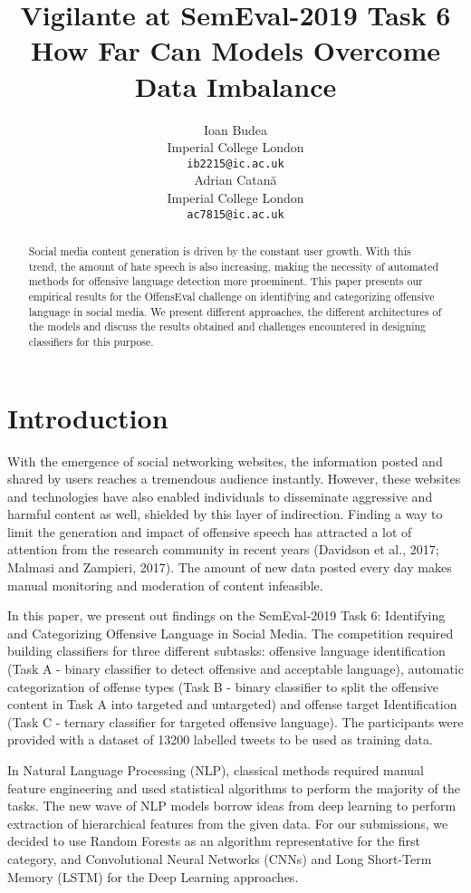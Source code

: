 \documentclass[11pt,a4paper]{article}
\title{Vigilante at SemEval-2019 Task 6 \\ How Far Can Models Overcome Data Imbalance}
\author{Ioan Budea \\
  Imperial College London \\
  {\tt ib2215@ic.ac.uk} \\\And
  Adrian Catan\u{a} \\
  Imperial College London \\
  {\tt ac7815@ic.ac.uk} \\}
\date{}
\begin{document}
\maketitle
\begin{abstract}

  Social media content generation is driven by the constant user growth. With this trend, the amount of hate speech is also increasing, making the necessity of automated methods for offensive language detection more proeminent.
  This paper presents our empirical results for the OffensEval challenge on identifying and categorizing offensive language in social media. We present different approaches, the different architectures of the models and discuss the results obtained and challenges encountered in designing classifiers for this purpose.

\end{abstract}

\section{Introduction}
With the emergence of social networking websites, the information posted and shared by users reaches a tremendous audience instantly. However, these websites and technologies have also enabled individuals to disseminate aggressive and harmful content as well, shielded by this layer of indirection. Finding a way to limit the generation and impact of offensive speech has attracted a lot of attention from the research community in recent years (Davidson et al., 2017; Malmasi and Zampieri, 2017). The amount of new data posted every day makes manual monitoring and moderation of content infeasible.

In this paper, we present out findings on the SemEval-2019 Task 6: Identifying and Categorizing Offensive Language in Social Media. The competition required building classifiers for three different subtasks: offensive language identification (Task A - binary classifier to detect offensive and acceptable language), automatic categorization of offense types (Task B - binary classifier to split the offensive content in Task A into targeted and untargeted) and offense target Identification (Task C - ternary classifier for targeted offensive language). The participants were provided with a dataset of 13200 labelled tweets to be used as training data.

In Natural Language Processing (NLP), classical methods required manual feature engineering and used statistical algorithms to perform the majority of the tasks. The new wave of NLP models borrow ideas from deep learning to perform extraction of hierarchical features from the given data. For our submissions, we decided to use Random Forests as an algorithm representative for the first category, and Convolutional Neural Networks (CNNs) and Long Short-Term Memory (LSTM) for the Deep Learning approaches.
\end{document}
